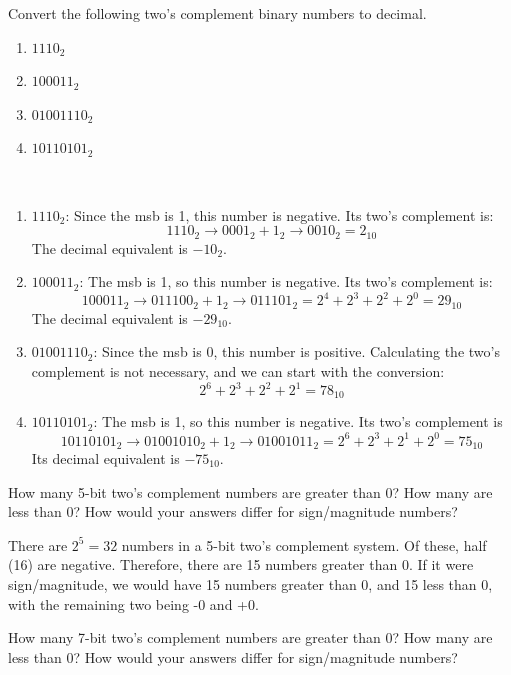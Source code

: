 \documentclass[12pt]{article}
\newenvironment{ex}[2][Exercise]{\begin{trivlist}
		\item[\hskip \labelsep {\bfseries #1}\hskip \labelsep {\bfseries #2.}]}{\end{trivlist}}
\newenvironment{sol}[1][Solution]{\begin{trivlist}
		\item[\hskip \labelsep {\bfseries #1:}]}{\end{trivlist}}
\begin{document}
\begin{ex}{1.22}
	Convert the following two's complement binary numbers to decimal.
	\begin{enumerate}[label=(\alph*)]
		\item $1110_2$
		\item $100011_2$
		\item $01001110_2$
		\item $10110101_2$
	\end{enumerate}
\end{ex}

\begin{sol}\
	\begin{enumerate}[label=(\alph*)]
		\item $1110_2$: Since the msb is 1, this number is negative. Its two's complement is:
		\[
		1110_2\to 0001_2+1_2\to0010_2=2_{10}
		\]
		The decimal equivalent is $-10_{2}$.
		\item $100011_2$: The msb is 1, so this number is negative. Its two's complement is:
		\[
		100011_2\to 011100_2+1_2\to 011101_2=2^{4}+2^{3}+2^{2}+2^{0}=29_{10}
		\]
		The decimal equivalent is $-29_{10}$.
		\item $01001110_2$: Since the msb is 0, this number is positive. Calculating the two's complement is not necessary, and we can start with the conversion:
		\[
		2^{6}+2^{3}+2^{2}+2^{1}=78_{10}
		\]
		\item $10110101_2$: The msb is 1, so this number is negative. Its two's complement is
		\[
		10110101_2\to 01001010_2+1_2\to01001011_2=2^{6}+2^{3}+2^{1}+2^{0}=75_{10}
		\]
		Its decimal equivalent is $-75_{10}$.
	\end{enumerate}
\end{sol}

\begin{ex}{1.41}
	How many 5-bit two's complement numbers are greater than 0? How many are less than 0? How would your answers differ for sign/magnitude numbers?
\end{ex}

\begin{sol}
	There are $2^{5}=32$ numbers in a 5-bit two's complement system. Of these, half (16) are negative. Therefore, there are 15 numbers greater than 0. If it were sign/magnitude, we would have 15 numbers greater than 0, and 15 less than 0, with the remaining two being -0 and +0.
\end{sol}

\begin{ex}{1.42}
	How many 7-bit two's complement numbers are greater than 0? How many are less than 0? How would your answers differ for sign/magnitude numbers?
\end{ex}
\end{document}
